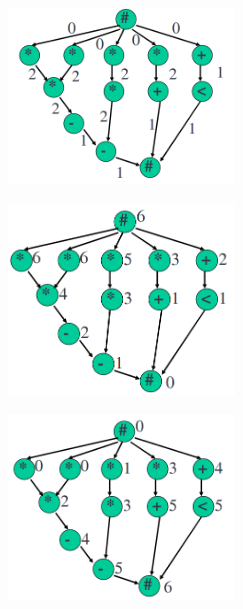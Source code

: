 \documentclass{article}
\begin{document}
\begin{itemize}
\begin{itemize}
                \begin{minipage}{0.33\linewidth}
                    \includegraphics[width=6cm]{S2/alap3.PNG}
                    \captionsetup{justification=centering}
                \end{minipage}%
                \hfill
                \begin{minipage}{0.33\linewidth}
                    \includegraphics[width=6cm]{S2/alap4}
                    \captionsetup{justification=centering}
                \end{minipage}%
                \hfill
                \begin{minipage}{0.33\linewidth}
                    \includegraphics[width=6cm]{S2/alap5}
                    \captionsetup{justification=centering}
                \end{minipage}%
                \vspace{0.5cm}


\end{itemize}
\end{itemize}
\end{document}
